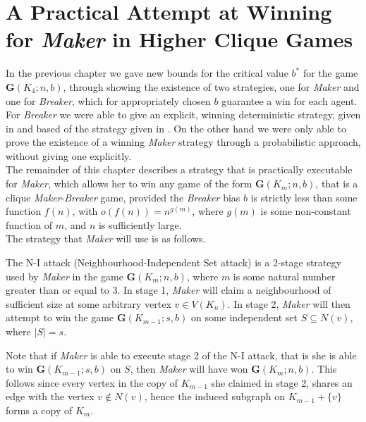 \documentclass[a4paper,oneside,11pt]{report}
\begin{document}
\chapter{A Practical Attempt at Winning for \textit{Maker} in Higher Clique Games}

In the previous chapter we gave new bounds for the critical value $b^*$ for the game $\textbf{G}(K_4;n,b)$, through showing the existence of two strategies, one for \textit{Maker} and one for \textit{Breaker}, which for appropriately chosen $b$ guarantee a win for each agent.\\

For \textit{Breaker} we were able to give an explicit, winning deterministic strategy, given in \cite{bednarska2000biased} and based of the strategy given in \cite{beck1982remarks}. On the other hand we were only able to prove the existence of a winning \textit{Maker} strategy through a probabilistic approach, without giving one explicitly.\\

The remainder of this chapter describes a strategy that is practically executable for \textit{Maker}, which allows her to win any game of the form $\textbf{G}(K_m;n,b)$, that is a clique \textit{Maker}-\textit{Breaker} game, provided the \textit{Breaker} bias $b$ is strictly less than some function $f(n)$, with $o(f(n)) = n^{g(m)}$, where $g(m)$ is some non-constant function of $m$, and $n$ is sufficiently large.\\

The strategy that \textit{Maker} will use is as follows.

\begin{definition}

The N-I attack (Neighbourhood-Independent Set attack) is a 2-stage strategy used by \textit{Maker} in the game $\textbf{G}(K_m;n,b)$, where $m$ is some natural number greater than or equal to 3. In stage 1, \textit{Maker} will claim a neighbourhood of sufficient size at some arbitrary vertex $v \in V(K_n)$. In stage 2, \textit{Maker} will then attempt to win the game $\textbf{G}(K_{m-1};s,b)$ on some independent set $S \subseteq N(v)$, where $\lvert S \rvert = s$.   

\end{definition}

Note that if \textit{Maker} is able to execute stage 2 of the N-I attack, that is she is able to win $\textbf{G}(K_{m-1};s,b)$ on $S$, then \textit{Maker} will have won $\textbf{G}(K_m;n,b)$. This follows since every vertex in the copy of $K_{m-1}$ she claimed in stage 2, shares an edge with the vertex $v \notin N(v)$, hence the induced subgraph on $K_{m-1}+\{v\}$ forms a copy of $K_m$.\\
\end{document}
